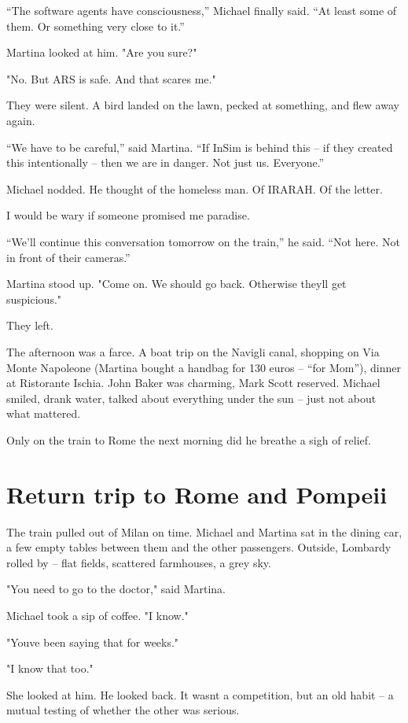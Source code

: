 \documentclass[
]{article}
\begin{document}
``The software agents have consciousness,'' Michael finally said. ``At least some of them. Or something very close to it.''

Martina looked at him. "Are you sure?"

"No. But ARS is safe. And that scares me."

They were silent. A bird landed on the lawn, pecked at something, and flew away again.

``We have to be careful,'' said Martina. ``If InSim is behind this -- if they created this intentionally -- then we are in danger. Not just us. Everyone.''

Michael nodded. He thought of the homeless man. Of IRARAH. Of the letter.

I would be wary if someone promised me paradise.

``We'll continue this conversation tomorrow on the train,'' he said. ``Not here. Not in front of their cameras.''

Martina stood up. "Come on. We should go back. Otherwise they\textquotesingle ll get suspicious."

They left.

The afternoon was a farce. A boat trip on the Navigli canal, shopping on Via Monte Napoleone (Martina bought a handbag for 130 euros -- ``for Mom''), dinner at Ristorante Ischia. John Baker was charming, Mark Scott reserved. Michael smiled, drank water, talked about everything under the sun -- just not about what mattered.

Only on the train to Rome the next morning did he breathe a sigh of relief.

\section{Return trip to Rome and Pompeii}\label{return-trip-to-rome-and-pompeii}

The train pulled out of Milan on time. Michael and Martina sat in the dining car, a few empty tables between them and the other passengers. Outside, Lombardy rolled by -- flat fields, scattered farmhouses, a grey sky.

"You need to go to the doctor," said Martina.

Michael took a sip of coffee. "I know."

"You\textquotesingle ve been saying that for weeks."

"I know that too."

She looked at him. He looked back. It wasn\textquotesingle t a competition, but an old habit -- a mutual testing of whether the other was serious.
\end{document}

